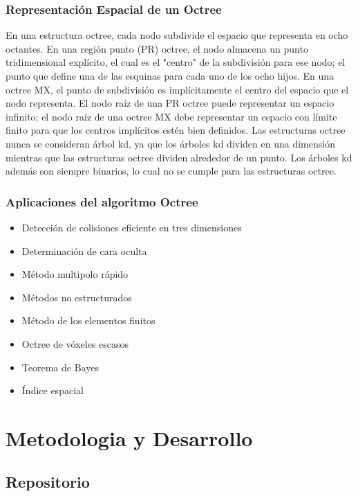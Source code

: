 \documentclass{article}
\begin{document}
\subsubsection{Representación Espacial de un Octree}
En una estructura octree, cada nodo subdivide el espacio que representa en ocho octantes. En una región punto (PR) octree, el nodo almacena un punto tridimensional explícito, el cual es el "centro" de la subdivisión para ese nodo; el punto que define una de las esquinas para cada uno de los ocho hijos. En una octree MX, el punto de subdivisión es implícitamente el centro del espacio que el nodo representa. El nodo raíz de una PR octree puede representar un espacio infinito; el nodo raíz de una octree MX debe representar un espacio con límite finito para que los centros implícitos estén bien definidos. Las estructuras octree nunca se consideran árbol kd, ya que los árboles kd dividen en una dimensión mientras que las estructuras octree dividen alrededor de un punto. Los árboles kd además son siempre binarios, lo cual no se cumple para las estructuras octree.

\subsubsection{Aplicaciones del algoritmo Octree}
\begin{itemize}
    \item Detección de colisiones eficiente en tres dimensiones
    \item Determinación de cara oculta
    \item Método multipolo rápido
    \item Métodos no estructurados
    \item Método de los elementos finitos
    \item Octree de vóxeles escasos
    \item Teorema de Bayes
    \item Índice espacial
\end{itemize}





\section{Metodologia y Desarrollo}
\subsection{Repositorio}
\end{document}
